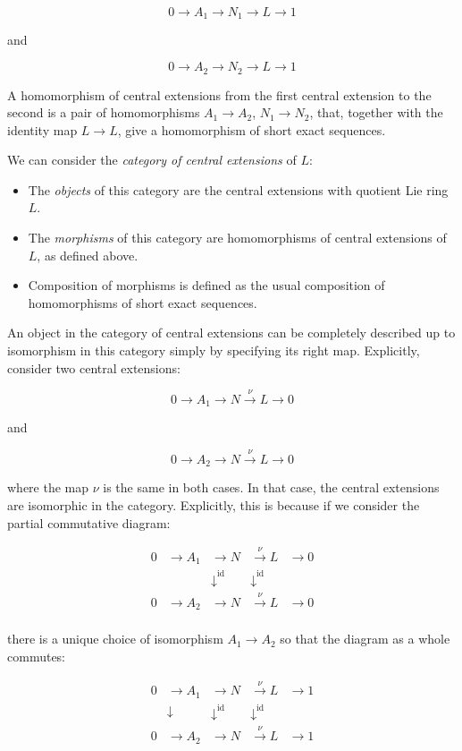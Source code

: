\documentclass{ucetd}
\begin{document}
$$0 \to A_1 \to N_1 \to L \to 1$$

and

$$0 \to A_2 \to N_2 \to L \to 1$$

A homomorphism of central extensions from the first central extension
to the second is a pair of homomorphisms $A_1 \to A_2$, $N_1 \to N_2$,
that, together with the identity map $L \to L$, give a homomorphism of
short exact sequences.

We can consider the {\em category of central extensions} of $L$:

\begin{itemize}
\item The {\em objects} of this category are the central extensions
  with quotient Lie ring $L$.
\item The {\em morphisms} of this category are homomorphisms of
  central extensions of $L$, as defined above.
\item Composition of morphisms is defined as the usual composition of
  homomorphisms of short exact sequences.
\end{itemize}

An object in the category of central extensions can be completely
described up to isomorphism in this category simply by specifying its
right map. Explicitly, consider two central extensions:

$$0 \to A_1 \to N \stackrel{\nu}{\to} L \to 0$$

and

$$0 \to A_2 \to N \stackrel{\nu}{\to} L \to 0$$

where the map $\nu$ is the same in both cases. In that case, the
central extensions are isomorphic in the category. Explicitly, this is
because if we consider the partial commutative diagram:

$$\begin{array}{rrrrr}
  0 & \to A_1 & \to N & \stackrel{\nu}{\to} L & \to 0 \\
  &  & \downarrow^{\text{id}} & \downarrow^{\text{id}} &\\
  0 & \to A_2 & \to N & \stackrel{\nu}{\to} L & \to 0 \\
\end{array}$$

there is a unique choice of isomorphism $A_1 \to A_2$ so that the
diagram as a whole commutes:

$$\begin{array}{rrrrr}
  0 & \to A_1 & \to N & \stackrel{\nu}{\to} L & \to 1 \\
  & \downarrow & \downarrow^{\text{id}} & \downarrow^{\text{id}} &\\
  0 & \to A_2 & \to N & \stackrel{\nu}{\to} L & \to 1 \\
\end{array}$$
\end{document}
